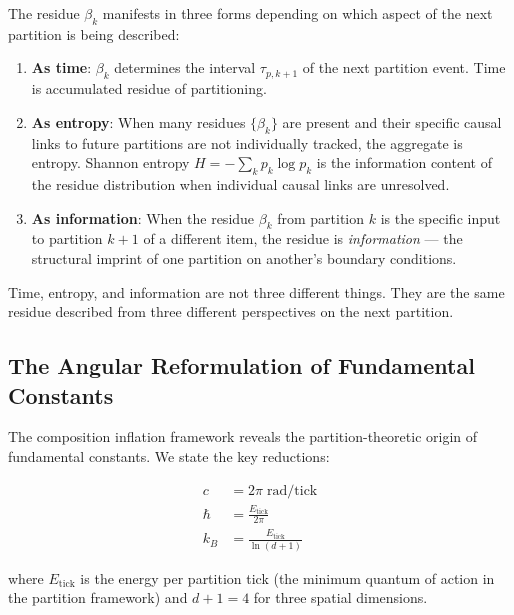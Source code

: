 \begin{corollary}
\label{cor:three_forms}
The residue $\beta_k$ manifests in three forms depending on which aspect of
the next partition is being described:
\begin{enumerate}
    \item \textbf{As time}: $\beta_k$ determines the interval $\tau_{p,k+1}$
          of the next partition event. Time is accumulated residue of partitioning.

    \item \textbf{As entropy}: When many residues $\{\beta_k\}$ are present and
          their specific causal links to future partitions are not individually
          tracked, the aggregate is entropy. Shannon entropy
          $H = -\sum_k p_k \log p_k$ is the information content of the
          residue distribution when individual causal links are unresolved.

    \item \textbf{As information}: When the residue $\beta_k$ from partition $k$
          is the specific input to partition $k+1$ of a different item, the
          residue is \emph{information} --- the structural imprint of one
          partition on another's boundary conditions.
\end{enumerate}
Time, entropy, and information are not three different things. They are the
same residue described from three different perspectives on the next partition.
\end{corollary}

\subsection{The Angular Reformulation of Fundamental Constants}
\label{subsec:angular}

The composition inflation framework reveals the partition-theoretic origin of
fundamental constants. We state the key reductions:

\begin{align}
    c &= 2\pi \;\mathrm{rad/tick}
    \label{eq:c_angular} \\
    \hbar &= \frac{E_{\mathrm{tick}}}{2\pi}
    \label{eq:hbar_angular} \\
    k_B &= \frac{E_{\mathrm{tick}}}{\ln(d+1)}
    \label{eq:kb_angular}
\end{align}

where $E_{\mathrm{tick}}$ is the energy per partition tick (the minimum quantum
of action in the partition framework) and $d+1 = 4$ for three spatial dimensions.

